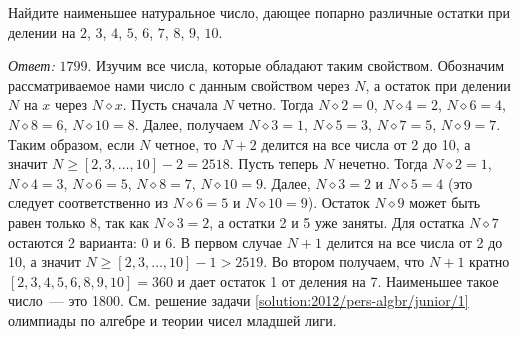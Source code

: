 Найдите наименьшее натуральное число, дающее попарно различные остатки при
делении на $2$, $3$, $4$, $5$, $6$, $7$, $8$, $9$, $10$.

\solution
\emph{Ответ:} $1799$.
%
\begingroup\let\div\diamond
Изучим все числа, которые обладают таким свойством.
Обозначим рассматриваемое нами число с данным свойством через $N$, а остаток
при делении $N$ на $x$ через $N \div x$.
Пусть сначала $N$ четно.
Тогда $N \div 2 = 0$, $N \div 4 = 2$, $N \div 6 = 4$, $N \div 8 = 6$,
$N \div 10 = 8$.
Далее, получаем $N \div 3 = 1$, $N \div 5 = 3$, $N \div 7 = 5$, $N \div 9 = 7$.
Таким образом, если $N$ четное, то $N + 2$ делится на все числа от 2 до 10,
а значит $N \geq [2, 3, \ldots, 10] - 2 = 2518$.
Пусть теперь $N$ нечетно.
Тогда $N \div 2 = 1$, $N \div 4 = 3$, $N \div 6 = 5$, $N \div 8 = 7$,
$N \div 10 = 9$.
Далее, $N \div 3 = 2$ и $N \div 5 = 4$
(это следует соответственно из $N \div 6 = 5$ и $N \div 10 = 9$).
Остаток $N \div 9$ может быть равен только 8, так как $N \div 3 = 2$, а остатки
2 и 5 уже заняты.
Для остатка $N \div 7$ остаются 2 варианта: 0 и 6.
В первом случае $N + 1$ делится на все числа от 2 до 10, а значит
$N \geq [2, 3, \ldots, 10] - 1 > 2519$.
Во втором получаем, что $N + 1$ кратно $[2, 3, 4, 5, 6, 8, 9, 10] = 360$ и дает
остаток 1 от деления на 7.
Наименьшее такое число~--- это 1800.
\endgroup
\else%
См. решение задачи \ref{solution:2012/pers-algbr/junior/1} олимпиады
по алгебре и теории чисел младшей лиги.
\fi

